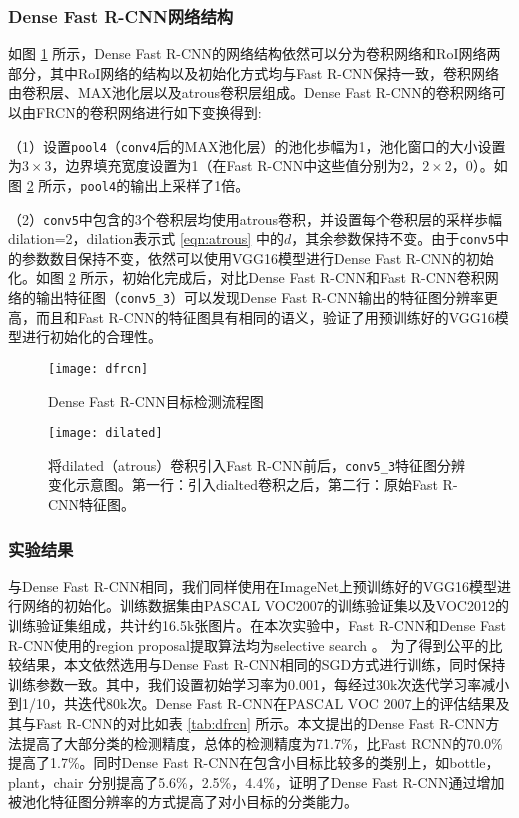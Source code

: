 \subsubsection{Dense Fast R-CNN网络结构}
如图 \ref{fig:dfrcn} 所示，Dense Fast R-CNN的网络结构依然可以分为卷积网络和RoI网络两部分，其中RoI网络的结构以及初始化方式均与Fast R-CNN保持一致，卷积网络由卷积层、MAX池化层以及atrous卷积层组成。Dense Fast R-CNN的卷积网络可以由FRCN的卷积网络进行如下变换得到:
\begin{namelist}{}
	\item （1）设置\texttt{pool4}（\texttt{conv4}后的MAX池化层）的池化歩幅为1，池化窗口的大小设置为$3\times3$，边界填充宽度设置为1（在Fast R-CNN中这些值分别为2，$2\times2$，0）。如图 \ref{fig:dilated} 所示，\texttt{pool4}的输出上采样了1倍。
	\item （2）\texttt{conv5}中包含的3个卷积层均使用atrous卷积，并设置每个卷积层的采样歩幅dilation=2，dilation表示式 \ref{eqn:atrous} 中的$d$，其余参数保持不变。由于\texttt{conv5}中的参数数目保持不变，依然可以使用VGG16模型进行Dense Fast R-CNN的初始化。如图 \ref{fig:dilated} 所示，初始化完成后，对比Dense Fast R-CNN和Fast R-CNN卷积网络的输出特征图（\texttt{conv5\_3}）可以发现Dense Fast R-CNN输出的特征图分辨率更高，而且和Fast R-CNN的特征图具有相同的语义，验证了用预训练好的VGG16模型进行初始化的合理性。
\end{namelist}

\begin{figure}[t]
	\centering
	\texttt{[image: dfrcn]}
	\caption{Dense Fast R-CNN目标检测流程图}
	\label{fig:dfrcn}
\end{figure}

\begin{figure}[h]
	\centering
	\texttt{[image: dilated]}
	\caption{将dilated（atrous）卷积引入Fast R-CNN前后，\texttt{conv5\_3}特征图分辨变化示意图。第一行：引入dialted卷积之后，第二行：原始Fast R-CNN特征图。}
	\label{fig:dilated}
\end{figure}

\subsubsection{实验结果}
与Dense Fast R-CNN相同，我们同样使用在ImageNet上预训练好的VGG16模型进行网络的初始化。训练数据集由PASCAL VOC2007的训练验证集以及VOC2012的训练验证集组成，共计约16.5k张图片。在本次实验中，Fast R-CNN和Dense Fast R-CNN使用的region proposal提取算法均为selective search \cite{selective-search}。 为了得到公平的比较结果，本文依然选用与Dense Fast R-CNN相同的SGD方式进行训练，同时保持训练参数一致。其中，我们设置初始学习率为0.001，每经过30k次迭代学习率减小到1/10，共迭代80k次。Dense Fast R-CNN在PASCAL VOC 2007上的评估结果及其与Fast R-CNN的对比如表 \ref{tab:dfrcn} 所示。本文提出的Dense Fast R-CNN方法提高了大部分类的检测精度，总体的检测精度为71.7\%，比Fast RCNN的70.0\%提高了1.7\%。同时Dense Fast R-CNN在包含小目标比较多的类别上，如bottle，plant，chair \cite{sdp} 分别提高了5.6\%，2.5\%，4.4\%，证明了Dense Fast R-CNN通过增加被池化特征图分辨率的方式提高了对小目标的分类能力。

